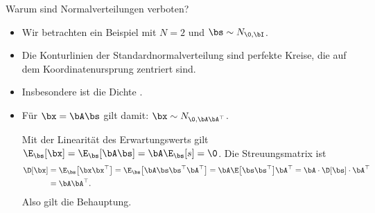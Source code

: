 \begin{frame}{Warum sind Normalverteilungen verboten?}{}
	\begin{itemize}
		\item Wir betrachten ein Beispiel mit $N = 2$ und $\bs \sim N_{\0, \bI}$.
		\item Die Konturlinien der Standardnormalverteilung sind perfekte Kreise, die auf dem Koordinatenursprung zentriert sind.
		\item Insbesondere ist die Dichte .
		\item Für $\bx = \bA \bs$ gilt damit: $\bx \sim N_{\0, \bA \bA^\top}$. \\ \vspace*{2mm}
		\begin{myproof}
			Mit der Linearität des Erwartungswerts gilt $\E_{\bs}[\bx] = \E_{\bs}[\bA \bs] = \bA \E_{\bs}[s] = \0$.
			Die Streuungsmatrix ist
			\begin{align*}
				\D[\bx]
					&= \E_{\bs}\bigl[ \bx \bx^\top \bigr]
						= \E_{\bs}\bigl[ \bA \bs \bs^\top \bA^\top \bigr]
						= \bA \E\bigl[ \bs \bs^\top \bigr] \bA^\top
						= \bA \cdot \D[\bs] \cdot \bA^\top
			\\
					&= \bA \bA^\top.
			\end{align*}
			Also gilt die Behauptung.
		\end{myproof} 
	\end{itemize}
\end{frame}


